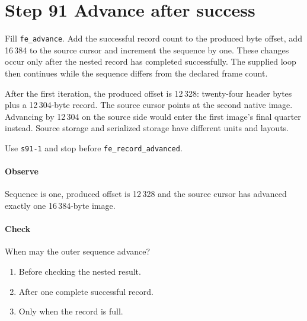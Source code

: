 \section{Step 91 Advance after success}
Fill \texttt{fe\_advance}. Add the successful record count to the produced byte offset, add 16\,384 to the source cursor and increment the sequence by one. These changes occur only after the nested record has completed successfully. The supplied loop then continues while the sequence differs from the declared frame count.

After the first iteration, the produced offset is 12\,328: twenty-four header bytes plus a 12\,304-byte record. The source cursor points at the second native image. Advancing by 12\,304 on the source side would enter the first image's final quarter instead. Source storage and serialized storage have different units and layouts.

Use \texttt{s91-1} and stop before \texttt{fe\_record\_advanced}.

\paragraph{Observe} Sequence is one, produced offset is 12\,328 and the source cursor has advanced exactly one 16\,384-byte image.

\paragraph{Check} When may the outer sequence advance?
\begin{enumerate}[label=\Alph*.]
  \item Before checking the nested result.
  \item After one complete successful record.
  \item Only when the record is full.
\end{enumerate}
